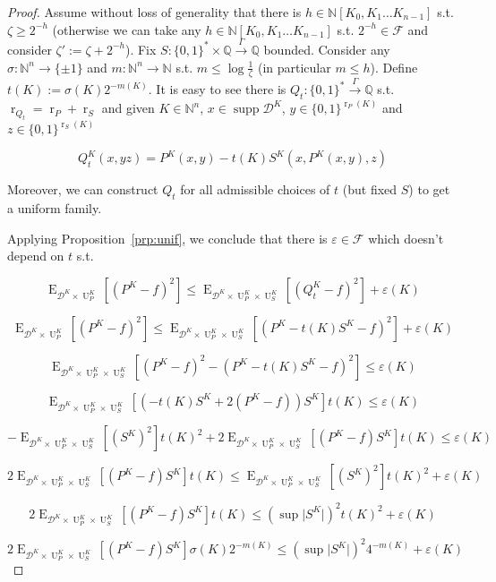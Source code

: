 \documentclass{article}
\numberwithin{equation}{section}
\theoremstyle{definition}
\theoremstyle{plain}
\newcommand{\Bool}{\{0,1\}}
\newcommand{\Words}{{\Bool^*}}
\newcommand{\WordsLen}[1]{{\Bool^{#1}}}
\DeclareMathOperator{\Supp}{supp}
\DeclareMathOperator{\E}{E}
\DeclareMathOperator{\R}{r}
\DeclareMathOperator{\Un}{U}
\newcommand{\Nats}{\mathbb{N}}
\newcommand{\Rats}{\mathbb{Q}}
\newcommand{\NatPoly}{\Nats[K_0, K_1 \ldots K_{n-1}]}
\newcommand{\NatFun}{\Nats^n \rightarrow}
\newcommand{\Abs}[1]{\lvert #1 \rvert}
\newcommand{\Dist}{\mathcal{D}}
\newcommand{\Fall}{\mathcal{F}}
\newcommand{\Scheme}{\xrightarrow{\Gamma}}
\begin{document}
\begin{proof}

Assume without loss of generality that there is ${h \in \NatPoly}$ s.t. $\zeta \geq 2^{-h}$ (otherwise we can take any $h \in \NatPoly$ s.t. $2^{-h} \in \Fall$ and consider $\zeta':=\zeta+2^{-h}$). Fix $S: \Words \times \Rats \Scheme \Rats$ bounded. Consider any ${\sigma: \NatFun \{ \pm 1 \}}$ and $m: \NatFun \Nats$ s.t. $m \leq \log \frac{1}{\zeta}$ (in particular ${m \leq h}$). Define ${t(K) := \sigma(K) 2^{-m(K)}}$. It is easy to see there is ${Q_t: \Words \Scheme \Rats}$ s.t. ${\R_{Q_t}=\R_P+\R_S}$ and given $K \in \Nats^n$, $x \in \Supp \Dist^{K}$, ${y \in \WordsLen{\R_P(K)}}$ and ${z \in \WordsLen{ \R_S(K)}}$

$$Q_t^{K}(x,yz) = P^{K}(x,y) - t(K) S^{K}(x,P^{K}(x,y),z)$$

Moreover, we can construct $Q_t$ for all admissible choices of $t$ (but fixed $S$) to get a uniform family.

Applying Proposition~\ref{prp:unif}, we conclude that there is $\varepsilon \in \Fall$ which doesn't depend on $t$ s.t.

$$\E_{\Dist^{K} \times \Un_P^{K}}[(P^{K} - f)^2] \leq \E_{\Dist^{K} \times \Un_P^{K} \times \Un_S^{K}}[(Q_t^{K} - f)^2] + \varepsilon(K)$$

$$\E_{\Dist^{K} \times \Un_P^{K}}[(P^{K} - f)^2] \leq \E_{\Dist^{K} \times \Un_P^{K} \times \Un_S^{K}}[(P^{K} - t(K)S^{K}  - f)^2] + \varepsilon(K)$$

$$\E_{\Dist^{K} \times \Un_P^{K} \times \Un_S^{K}}[(P^{K} - f)^2 - (P^{K} - t(K)S^{K} - f)^2] \leq \varepsilon(K)$$

$$\E_{\Dist^{K} \times \Un_P^{K} \times \Un_S^{K}}[(-t(K)S^{K} + 2 (P^{K} - f)) S^{K}] t(K) \leq \varepsilon(K)$$

$$-\E_{\Dist^{K} \times \Un_P^{K} \times \Un_S^{K}}[(S^{K})^2] t(K)^2 + 2 \E_{\Dist^{K} \times \Un_P^{K} \times \Un_S^{K}}[(P^{K} - f) S^{K}] t(K) \leq \varepsilon(K)$$

$$2 \E_{\Dist^{K} \times \Un_P^{K} \times \Un_S^{K}}[(P^{K} - f) S^{K}] t(K) \leq \E_{\Dist^{K} \times \Un_P^{K} \times \Un_S^{K}}[(S^{K})^2] t(K)^2 + \varepsilon(K)$$

$$2 \E_{\Dist^{K} \times \Un_P^{K} \times \Un_S^{K}}[(P^{K} - f) S^{K}] t(K) \leq (\sup \Abs{S^{K}})^2 t(K)^2 + \varepsilon(K)$$

$$2 \E_{\Dist^{K} \times \Un_P^{K} \times \Un_S^{K}}[(P^{K} - f) S^{K}] \sigma(K) 2^{-m(K)} \leq (\sup \Abs{S^{K}})^2 4^{-m(K)} + \varepsilon(K)$$


\end{proof}
\end{document}
